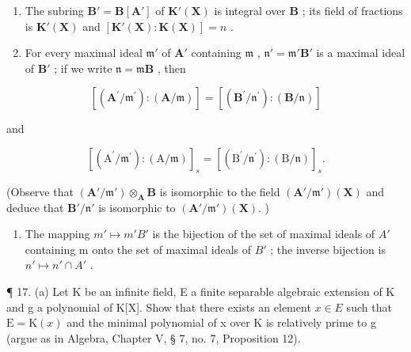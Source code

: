 \begin{enumerate}
\def\labelenumi{(\alph{enumi})}
\item
  The subring \(\mathbf{B}' = \mathbf{B}[\mathbf{A}']\) of \(\mathbf{K}'(\mathbf{X})\) is integral over \(\mathbf{B}\) ; its field of fractions is \(\mathbf{K}'(\mathbf{X})\) and \([\mathbf{K}'(\mathbf{X}) : \mathbf{K}(\mathbf{X})] = n\) .
\item
  For every maximal ideal \(\mathfrak{m}'\) of \(\mathbf{A}'\) containing \(\mathfrak{m}\) , \(\mathfrak{n}' = \mathfrak{m}'\mathbf{B}'\) is a maximal ideal of \(\mathbf{B}'\) ; if we write \(\mathfrak{n} = \mathfrak{m}\mathbf{B}\) , then
\end{enumerate}

\[
[ (\mathbf {A} ^ {\prime} / \mathfrak {m} ^ {\prime}): (\mathbf {A} / \mathfrak {m}) ] = [ (\mathbf {B} ^ {\prime} / \mathfrak {n} ^ {\prime}): (\mathbf {B} / \mathfrak {n}) ]
\]

and

\[
[ (\mathrm{A} ^ {\prime} / \mathfrak {m} ^ {\prime}): (\mathrm{A} / \mathfrak {m}) ] _ {s} = [ (\mathrm{B} ^ {\prime} / \mathfrak {n} ^ {\prime}): (\mathrm{B} / \mathfrak {n}) ] _ {s}.
\]

(Observe that \((\mathbf{A}' / \mathfrak{m}') \otimes_{\mathbf{A}} \mathbf{B}\) is isomorphic to the field \((\mathbf{A}' / \mathfrak{m}')(\mathbf{X})\) and deduce that \(\mathbf{B}' / \mathfrak{n}'\) is isomorphic to \((\mathbf{A}' / \mathfrak{m}')(\mathbf{X}).\) )

\begin{enumerate}
\def\labelenumi{(\alph{enumi})}
\setcounter{enumi}{2}
\tightlist
\item
  The mapping \(m' \mapsto m'B'\) is the bijection of the set of maximal ideals of \(A'\) containing m onto the set of maximal ideals of \(B'\) ; the inverse bijection is \(n' \mapsto n' \cap A'\) .
\end{enumerate}

¶ 17. (a) Let K be an infinite field, E a finite separable algebraic extension of K and g a polynomial of K{[}X{]}. Show that there exists an element \(x \in E\) such that \(\mathrm{E} = \mathrm{K}(x)\) and the minimal polynomial of x over K is relatively prime to g (argue as in Algebra, Chapter V, § 7, no. 7, Proposition 12).

